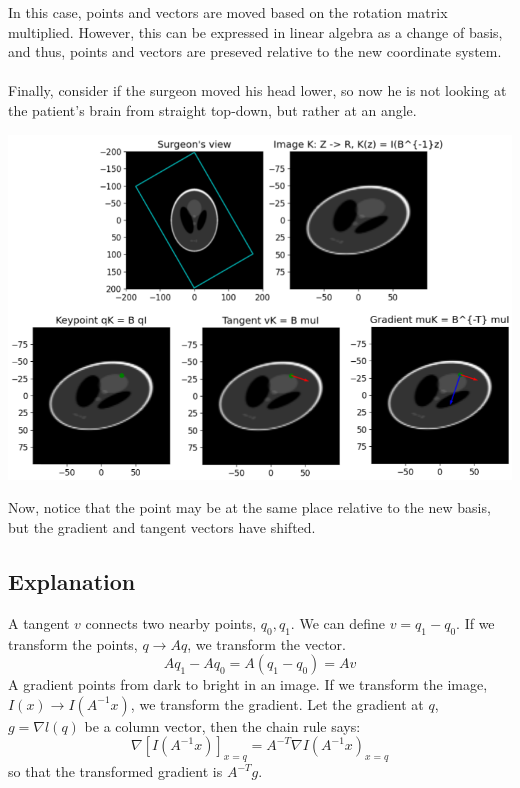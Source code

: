 \documentclass[10pt]{article}
\begin{document}
In this case, points and vectors are moved based on the rotation matrix multiplied.  However, this can be expressed in linear algebra as a change of basis, and thus, points and vectors are preseved relative to the new coordinate system.\\\\
Finally, consider if the surgeon moved his head lower, so now he is not looking at the patient's brain from straight top-down, but rather at an angle.
\begin{center}
    \includegraphics*[width=\textwidth]{W2_5.png}
\end{center}
Now, notice that the point may be at the same place relative to the new basis, but the gradient and tangent vectors have shifted.
\subsection*{Explanation}
A tangent $v$ connects two nearby points, $q_0, q_1$.  We can define $v = q_1 - q_0$.  If we transform the points, $q \rightarrow Aq$, we transform the vector.
\[Aq_1 - Aq_0 = A(q_1 - q_0) = Av\]
A gradient points from dark to bright in an image.  If we transform the image, $I(x) \rightarrow I(A^{-1}x)$, we transform the gradient.  Let the gradient at $q$, $g = \nabla l(q)$ be a column vector, then the chain rule says:
\[\nabla[I(A^{-1}x)]_{x = q} = A^{-T}\nabla I(A^{-1}x)_{x=q}\]
so that the transformed gradient is $A^{-T}g$.
\end{document}
